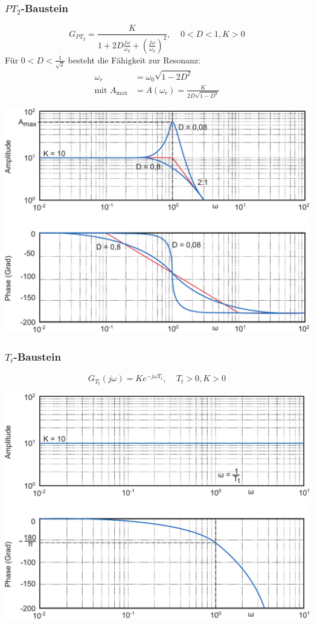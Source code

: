 \documentclass[a4paper,twocolumn,10pt]{article}
\begin{document}
\subsubsection{$PT_2$-Baustein}
\begin{equation*}
G_{PT_2}=\frac{K}{1+2D\frac{j\omega}{\omega_0}+\left(\frac{j\omega}{\omega_0}\right)^2},\;\;\;\;0<D<1,K>0
\end{equation*}
Für $0<D<\frac{1}{\sqrt{2}}$ besteht die Fähigkeit zur Resonanz:
\begin{equation*}
\begin{split}
\omega_r&=\omega_0\sqrt{1-2D^2}\\
\text{mit }A_{\text{max}}&=A(\omega_r)=\frac{K}{2D\sqrt{1-D^2}}
\end{split}
\end{equation*}
\begin{center}
\includegraphics[width=0.95\columnwidth]{Grafiken/Bodediagramm_PT2}
\end{center}

\subsubsection{$T_t$-Baustein}
\begin{equation*}
G_{T_t}(j\omega)=Ke^{-j\omega T_t},\;\;\;\;T_t>0,K>0
\end{equation*}
\begin{center}
\includegraphics[width=0.95\columnwidth]{Grafiken/Bodediagramm_Tt}
\end{center}
\end{document}
